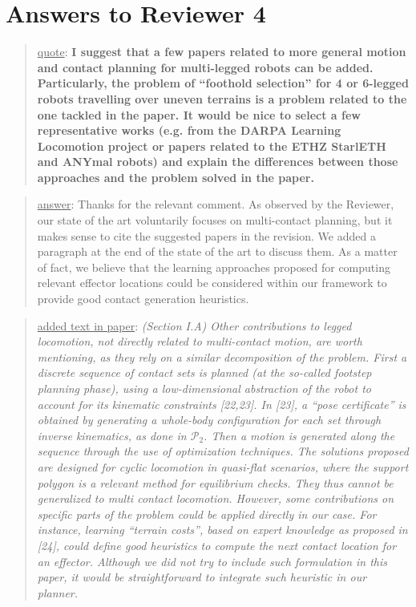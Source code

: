 \documentclass[a4paper]{article}
\newcommand{\done}[0]{}
\newcommand\quot[1]{\begin{quote} \underline{quote}: \textbf{#1}\end{quote}}
\newcommand\as[1]{\begin{quote} \underline{answer}: {#1}\end{quote} }
\newcommand\qt[1]{\begin{quote} \underline{added text in paper}: \textit{#1}\end{quote} \leavevmode \\ }
\begin{document}
\section{Answers to Reviewer 4}

\quot{ I suggest that a few papers related to more general motion and contact planning for multi-legged robots can be added. Particularly, the problem of ``foothold selection'' for 4 or 6-legged robots travelling over uneven terrains is a problem related to the one tackled in the paper. It would be nice to select a few representative works (e.g. from the DARPA Learning Locomotion project or
papers related to the ETHZ StarlETH and ANYmal robots) and explain the differences between those approaches and the problem solved in the paper.}
\as{Thanks for the relevant comment. As observed by the Reviewer, our state of the art voluntarily focuses on multi-contact planning, but it makes sense to cite the suggested papers in the revision. We added a paragraph at the end of the state of the art to discuss them. As a matter of fact, we believe that the learning approaches 
proposed for computing relevant effector locations could be considered within
our framework to provide good contact generation heuristics.}
\qt{(Section I.A) Other contributions to legged locomotion, not directly related to multi-contact motion, are worth mentioning, as they rely on a similar decomposition of the problem. First a discrete sequence 
of contact sets is planned (at the so-called footstep planning phase), using a low-dimensional abstraction of the robot to account for its kinematic constraints [22,23]. In [23], a ``pose certificate'' is obtained by generating a whole-body configuration for each set through inverse kinematics, as done in $\mathcal{P}_2$. Then a
motion is generated along the sequence through the use of optimization techniques. 
The solutions proposed are designed for cyclic locomotion in quasi-flat scenarios, where the support polygon is a relevant method for equilibrium checks. They thus cannot be generalized to multi contact locomotion. 
However, some contributions on specific parts of the problem could be applied directly in our case. 
For instance, learning ``terrain costs'', based on expert knowledge as proposed in [24], could define good heuristics to compute the next contact location for an effector. Although we did not try to include such formulation in this paper, it would be straightforward to integrate such heuristic in our planner.}\done
\end{document}
